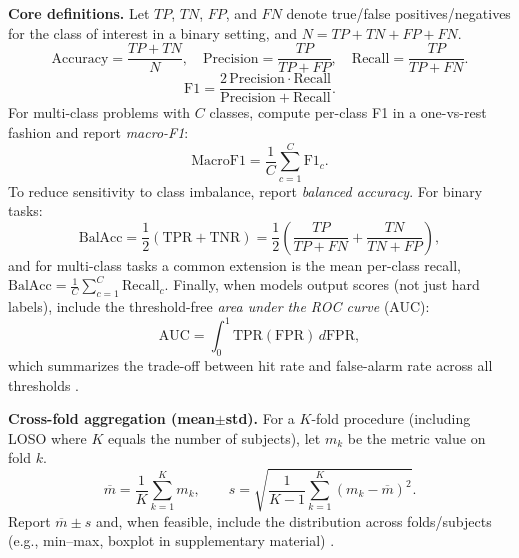 \documentclass{WileyMSP-template}
\begin{document}
\textbf{Core definitions.}
Let $TP$, $TN$, $FP$, and $FN$ denote true/false positives/negatives for the class of interest in a binary setting, and $N=TP+TN+FP+FN$.
\begin{equation}
\mathrm{Accuracy}=\frac{TP+TN}{N}, \quad
\mathrm{Precision}=\frac{TP}{TP+FP}, \quad
\mathrm{Recall}=\frac{TP}{TP+FN}.
\label{eq:basic_metrics}
\end{equation}
\begin{equation}
\mathrm{F1}=\frac{2\,\mathrm{Precision}\cdot \mathrm{Recall}}{\mathrm{Precision}+\mathrm{Recall}}.
\label{eq:f1}
\end{equation}
For multi-class problems with $C$ classes, compute per-class F1 in a one-vs-rest fashion and report \emph{macro-F1}:
\begin{equation}
\mathrm{MacroF1}=\frac{1}{C}\sum_{c=1}^{C}\mathrm{F1}_c.
\label{eq:macro_f1}
\end{equation}
To reduce sensitivity to class imbalance, report \emph{balanced accuracy}. For binary tasks:
\begin{equation}
\mathrm{BalAcc}=\frac{1}{2}\left(\mathrm{TPR}+\mathrm{TNR}\right)
=\frac{1}{2}\left(\frac{TP}{TP+FN}+\frac{TN}{TN+FP}\right),
\label{eq:balacc}
\end{equation}
and for multi-class tasks a common extension is the mean per-class recall,
$\mathrm{BalAcc}=\frac{1}{C}\sum_{c=1}^{C}\mathrm{Recall}_c$.
Finally, when models output scores (not just hard labels), include the threshold-free \emph{area under the ROC curve} (AUC):
\begin{equation}
\mathrm{AUC}=\int_{0}^{1}\mathrm{TPR}(\mathrm{FPR})\, d\mathrm{FPR},
\label{eq:auc}
\end{equation}
which summarizes the trade-off between hit rate and false-alarm rate across all thresholds \cite{Fawcett2006ROC}.

\textbf{Cross-fold aggregation (mean$\pm$std).}
For a $K$-fold procedure (including LOSO where $K$ equals the number of subjects), let $m_k$ be the metric value on fold $k$.
\begin{equation}
\overline{m}=\frac{1}{K}\sum_{k=1}^{K} m_k, \qquad
s=\sqrt{\frac{1}{K-1}\sum_{k=1}^{K}\left(m_k-\overline{m}\right)^2}.
\label{eq:mean_std}
\end{equation}
Report $\overline{m}\pm s$ and, when feasible, include the distribution across folds/subjects (e.g., min--max, boxplot in supplementary material) \cite{kukhilava2025evaluation}.
\end{document}
